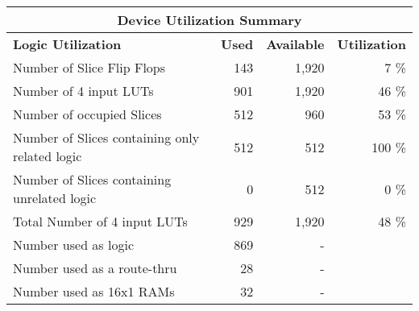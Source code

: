 \begin{table}[!htbp]
\centering
    \begin{tabular}{|l|r|r|r|}
    \hline
    \multicolumn{4}{|c|}{\textbf{Device Utilization Summary}}                                                                                                                 \\ \hline
    \textbf{Logic Utilization}                     & \multicolumn{1}{l|}{\textbf{Used}} & \multicolumn{1}{l|}{\textbf{Available}} & \multicolumn{1}{l|}{\textbf{Utilization}} \\ \hline
    Number of Slice Flip Flops                     & 143                                & 1,920                                   & 7 \%                                      \\ \hline
    Number of 4 input LUTs                         & 901                                & 1,920                                   & 46 \%                                     \\ \hline
    Number of occupied Slices                      & 512                                & 960                                     & 53 \%                                     \\ \hline
    Number of Slices containing only related logic & 512                                & 512                                     & 100 \%                                    \\ \hline
    Number of Slices containing unrelated logic    & 0                                  & 512                                     & 0 \%                                      \\ \hline
    Total Number of 4 input LUTs                   & 929                                & 1,920                                   & 48 \%                                     \\ \hline
    Number used as logic                           & 869                                & -                                       &                                           \\ \hline
    Number used as a route-thru                    & 28                                 & -                                       &                                           \\ \hline
    Number used as 16x1 RAMs                       & 32                                 & -                                       &                                           \\ \hline

\end{tabular}
\end{table}
